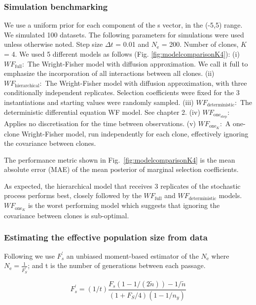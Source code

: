 \documentclass{article}
\newcommand{\eps}{N_{\text{e}}}
\begin{document}
\subsubsection{Simulation benchmarking}
We use a uniform prior for each component of the s vector, in the (-5,5) range.
We simulated 100 datasets. 
The following parameters for simulations were used unless otherwise noted. 
Step size $\Delta t$ = 0.01 and $\eps$ = 200. 
Number of clones, $K$ = 4.
We used 5 different models as follows (Fig. \ref{fig:modelcomparisonK4}):
(i) $WF_{\text{full}}:$ The Wright-Fisher model with diffusion approximation. 
We call it full to emphasize the incorporation of all interactions between all clones.
(ii) $WF_{\text{hierarchical}}:$
The Wright-Fisher model with diffusion approximation, with three conditionally independent replicates. 
Selection coefficients were fixed for the 3 instantiations and starting values were randomly sampled.
(iii) $WF_{\text{deterministic}}:$ The deterministic differential equation WF model. See chapter 2.
(iv) $WF_{\text{one}_{\text{step}}}:$ Applies no discretisation for the time between observations. 
(v) $WF_{\text{one}_K}:$ A one-clone Wright-Fisher model, run independently for each clone, effectively ignoring the covariance between clones.

The performance metric shown in Fig.\ \ref{fig:modelcomparisonK4} is the mean absolute error (MAE) of the mean posterior of marginal selection coefficients. 

As expected, the hierarchical model that receives 3 replicates of the stochastic process performs best, closely followed by the $WF_{\text{full}}$ and $WF_{\text{deterministic}}$ models. 
$WF_{\text{one}_K}$ is the worst performing model which suggests that ignoring the covariance between clones is sub-optimal.



\subsubsection{Estimating the effective population size from data}
\label{ssec:estimate_ne}

Following \cite{jorde1999estimating} we use $F^{'}_{s}$ an unbiased moment-based estimator of the $\eps$ where $\eps = \frac{1}{F^{'}_{S}}$; and t is the number of generations between each passage.

\begin{equation} \label{eq:fsprime}
F^{'}_{s} = (1/t) \frac{F_s (1 - 1/(2\tilde{n})) - 1/\tilde{n}}{(1+F_S/4)(1-1/n_y)}
\end{equation}
\end{document}
